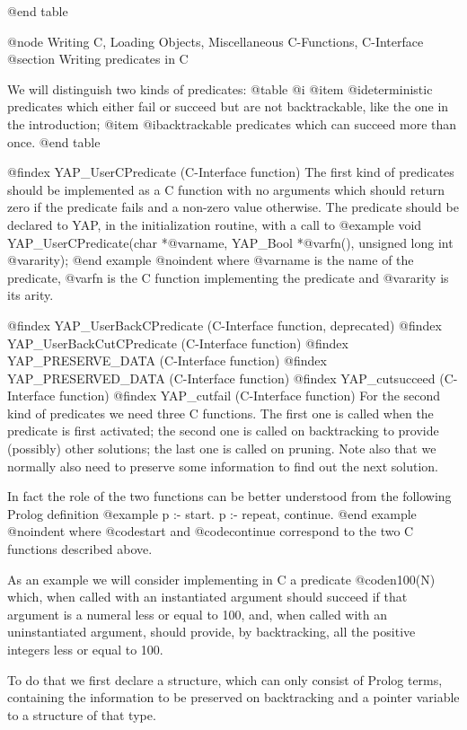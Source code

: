 {{{{{{{{{@end table


@node Writing C, Loading Objects, Miscellaneous C-Functions, C-Interface
@section Writing predicates in C

We will distinguish two kinds of predicates:
@table @i
@item @i{deterministic} predicates which either fail or succeed but are not
backtrackable, like the one in the introduction;
@item @i{backtrackable}
predicates which can succeed more than once.
@end table

@findex YAP_UserCPredicate (C-Interface function)
The first kind of predicates should be implemented as a C function with
no arguments which should return zero if the predicate fails and a
non-zero value otherwise. The predicate should be declared to
YAP, in the initialization routine, with a call to
@example
      void YAP_UserCPredicate(char *@var{name}, YAP_Bool *@var{fn}(), unsigned long int @var{arity});
@end example
@noindent
where @var{name} is the name of the predicate, @var{fn} is the C function
implementing the predicate and @var{arity} is its arity.

@findex YAP_UserBackCPredicate (C-Interface function, deprecated)
@findex YAP_UserBackCutCPredicate (C-Interface function)
@findex YAP_PRESERVE_DATA (C-Interface function)
@findex YAP_PRESERVED_DATA (C-Interface function)
@findex YAP_cutsucceed (C-Interface function)
@findex YAP_cutfail (C-Interface function)
For the second kind of predicates we need three C functions. The first one
 is called when the predicate is first activated; the second one
is called on backtracking to provide (possibly) other solutions; the
 last one is called on pruning. Note
also that we normally also need to preserve some information to find out
the next solution.

In fact the role of the two functions can be better understood from the
following Prolog definition
@example
       p :- start.
       p :- repeat,
                continue.
@end example
@noindent
where @code{start} and @code{continue} correspond to the two C functions
described above.


As an example we will consider implementing in C a predicate @code{n100(N)}
which, when called with an instantiated argument should succeed if that
argument is a numeral less or equal to 100, and, when called with an
uninstantiated argument, should provide, by backtracking, all the positive
integers less or equal to 100.

   To do that we first declare a structure, which can only consist
of Prolog terms, containing the information to be preserved on backtracking
and a pointer variable to a structure of that type.

}}}}}}}}}
